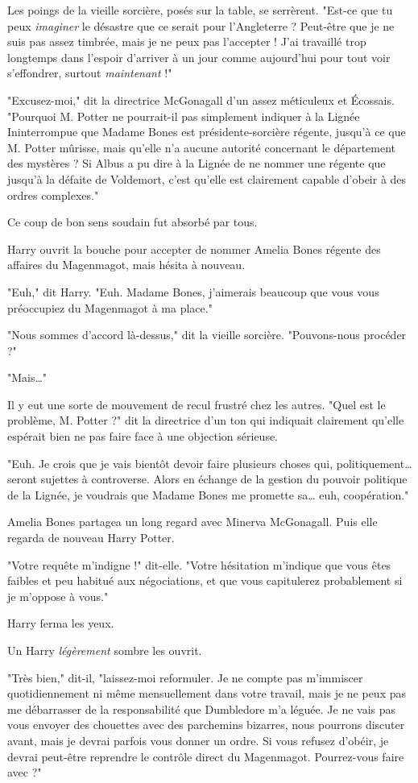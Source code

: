 Les poings de la vieille sorcière, posés sur la table, se serrèrent. "Est-ce que tu peux \emph{imaginer}  le désastre que ce serait pour l'Angleterre ? Peut-être que je ne suis pas assez timbrée, mais je ne peux pas l'accepter ! J'ai travaillé trop longtemps dans l'espoir d'arriver à un jour comme aujourd'hui pour tout voir s'effondrer, surtout \emph{maintenant}  !"

"Excusez-moi," dit la directrice McGonagall d'un assez méticuleux et Écossais. "Pourquoi M. Potter ne pourrait-il pas simplement indiquer à la Lignée Ininterrompue que Madame Bones est présidente-sorcière régente, jusqu'à ce que M. Potter mûrisse, mais qu'elle n'a aucune autorité concernant le département des mystères ? Si Albus a pu dire à la Lignée de ne nommer une régente que jusqu'à la défaite de Voldemort, c'est qu'elle est clairement capable d'obeir à des ordres complexes."

Ce coup de bon sens soudain fut absorbé par tous.

Harry ouvrit la bouche pour accepter de nommer Amelia Bones régente des affaires du Magenmagot, mais hésita à nouveau.

"Euh," dit Harry. "Euh. Madame Bones, j'aimerais beaucoup que vous vous préoccupiez du Magenmagot à ma place."

"Nous sommes d'accord là-dessus," dit la vieille sorcière. "Pouvons-nous procéder ?"

"Mais…"

Il y eut une sorte de mouvement de recul frustré chez les autres. "Quel est le problème, M. Potter ?" dit la directrice d'un ton qui indiquait clairement qu'elle espérait bien ne pas faire face à une objection sérieuse.

"Euh. Je crois que je vais bientôt devoir faire plusieurs choses qui, politiquement… seront sujettes à controverse. Alors en échange de la gestion du pouvoir politique de la Lignée, je voudrais que Madame Bones me promette sa… euh, coopération."

Amelia Bones partagea un long regard avec Minerva McGonagall. Puis elle regarda de nouveau Harry Potter.

"Votre requête m'indigne !" dit-elle. "Votre hésitation m'indique que vous êtes faibles et peu habitué aux négociations, et que vous capitulerez probablement si je m'oppose à vous."

Harry ferma les yeux.

Un Harry \emph{légèrement}  sombre les ouvrit.

"Très bien," dit-il, "laissez-moi reformuler. Je ne compte pas m'immiscer quotidiennement ni même mensuellement dans votre travail, mais je ne peux pas me débarrasser de la responsabilité que Dumbledore m'a léguée. Je ne vais pas vous envoyer des chouettes avec des parchemins bizarres, nous pourrons discuter avant, mais je devrai parfois vous donner un ordre. Si vous refusez d'obéir, je devrai peut-être reprendre le contrôle direct du Magenmagot. Pourrez-vous faire avec ?"

